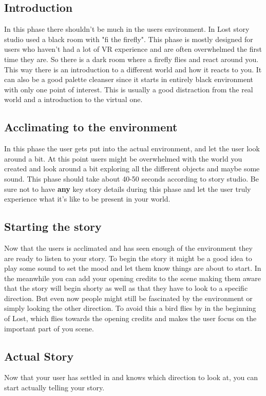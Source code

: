 \documentclass{report}
\begin{document}
				\subsection{Introduction}
				In this phase there shouldn't be much in the users environment. In Lost story studio used a black room with "fi the firefly". This phase is mostly designed for users who haven't had a lot of VR experience and are often overwhelmed the first time they are. So there is a dark room where a firefly flies and react around you. This way there is an introduction to a different world and how it reacts to you. It can also be a good palette cleanser since it starts in entirely black environment with only one point of interest. This is usually a good distraction from the real world and a introduction to the virtual one.
				
				\subsection{Acclimating to the environment}
				In this phase the user gets put into the actual environment, and let the user look around a bit. At this point users might be overwhelmed with the world you created and look around a bit exploring all the different objects and maybe some sound. This phase should take about 40-50 seconds according to story studio. Be sure not to have \textbf{any} key story details during this phase and let the user truly experience what it's like to be present in your world.
				
				\subsection{Starting the story}
				Now that the users is acclimated and has seen enough of the environment they are ready to listen to your story. To begin the story it might be a good idea to play some sound to set the mood and let them know things are about to start. In the meanwhile you can add your opening credits to the scene making them aware that the story will begin shorty as well as that they have to look to a specific direction. But even now people might still be fascinated by the environment or simply looking the other direction. To avoid this a bird flies by in the beginning of Lost, which flies towards the opening credits and makes the user focus on the important part of you scene.
				
				\subsection{Actual Story}
				Now that your user has settled in and knows which direction to look at, you can start actually telling your story.
\end{document}
